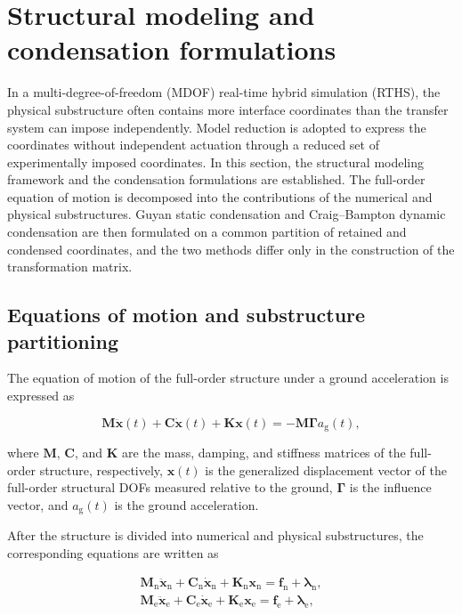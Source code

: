 \documentclass[a4paper,fleqn,review,12pt]{cas-sc}
\begin{document}
\section{Structural modeling and condensation formulations} \label{sec2}

In a multi-degree-of-freedom (MDOF) real-time hybrid simulation (RTHS), the physical substructure often contains more interface coordinates than the transfer system can impose independently. Model reduction is adopted to express the coordinates without independent actuation through a reduced set of experimentally imposed coordinates.
In this section, the structural modeling framework and the condensation formulations are established. The full-order equation of motion is decomposed into the contributions of the numerical and physical substructures. Guyan static condensation and Craig--Bampton dynamic condensation are then formulated on a common partition of retained and condensed coordinates, and the two methods differ only in the construction of the transformation matrix.

\subsection{Equations of motion and substructure partitioning}
The equation of motion of the full-order structure under a ground acceleration is expressed as

\vspace{-3.5em}
\begin{equation}
	\mathbf{M}\ddot{\bm{x}}(t)+\mathbf{C}\dot{\bm{x}}(t)+\mathbf{K}\bm{x}(t)
	=-\mathbf{M}\bm{\Gamma}a_{\mathrm{g}}(t),
	\label{eq:full-order-eom}
\end{equation}
\vspace{-3.5em}

\noindent where \(\mathbf{M}\), \(\mathbf{C}\), and \(\mathbf{K}\) are the mass, damping, and stiffness matrices of the full-order structure, respectively, \(\bm{x}(t)\) is the generalized displacement vector of the full-order structural DOFs measured relative to the ground, \(\bm{\Gamma}\) is the influence vector, and \(a_{\mathrm{g}}(t)\) is the ground acceleration.

After the structure is divided into numerical and physical substructures, the corresponding equations are written as

\vspace{-3.5em}
\begin{subequations}
	\label{eq:substructure-eom}
	\begin{align}
		\mathbf{M}_{\mathrm{n}}\ddot{\bm{x}}_{\mathrm{n}}
		+\mathbf{C}_{\mathrm{n}}\dot{\bm{x}}_{\mathrm{n}}
		+\mathbf{K}_{\mathrm{n}}\bm{x}_{\mathrm{n}}
		=\bm{f}_{\mathrm{n}}{}+\bm{\lambda}_{\mathrm{n}},
		\label{eq:numerical-eom}\\
		\mathbf{M}_{\mathrm{e}}\ddot{\bm{x}}_{\mathrm{e}}
		+\mathbf{C}_{\mathrm{e}}\dot{\bm{x}}_{\mathrm{e}}
		+\mathbf{K}_{\mathrm{e}}\bm{x}_{\mathrm{e}}
		=\bm{f}_{\mathrm{e}}{}+\bm{\lambda}_{\mathrm{e}},
		\label{eq:physical-eom}
	\end{align}
\end{subequations}
\vspace{-3.5em}
\end{document}
